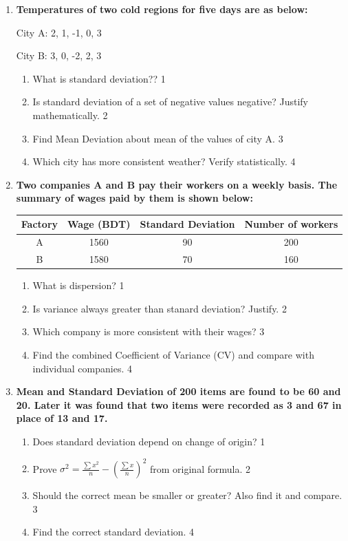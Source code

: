 \documentclass[a4paper,oneside]{book}
\begin{document}
\begin{enumerate}
    \item
  \textbf{Temperatures of two cold regions for five days are as below:}

    City A: 2, 1, -1, 0, 3

    City B: 3, 0, -2, 2, 3
  \begin{enumerate}
    \item
	What is standard deviation?? \hfill 1
    \item
	Is standard deviation of a set of negative values negative? Justify mathematically. \hfill 2
    \item  
	Find Mean Deviation about mean of the values of city A.  \hfill 3
    \item
	Which city has more consistent weather? Verify statistically. \hfill 4
\end{enumerate}

 \item
	  \textbf{Two companies A and B pay their workers on a weekly basis. The summary of wages paid by them is shown below:} 
	  
	  \begin{table}[h]
	  \centering
\begin{tabular}{c|ccc}
Factory & Wage (BDT) & Standard Deviation & Number of workers \\ \hline
A       & 1560       & 90                 & 200               \\ 
B       & 1580       & 70                 & 160              
\end{tabular}
\end{table}
  
  \begin{enumerate}
    \item
	What is dispersion? \hfill 1
    \item
	Is variance always greater than stanard deviation? Justify. \hfill 2
    \item  
	Which company is more consistent with their wages? \hfill 3
    \item
	Find the combined Coefficient of Variance (CV) and compare with individual companies. \hfill 4
  \end{enumerate}

 \item
	  \textbf{Mean and Standard Deviation of 200 items are found to be 60 and 20. Later it was found that two items were recorded as 3 and 67 in place of 13 and 17.} 
  
  \begin{enumerate}
    \item
	Does standard deviation depend on change of origin? \hfill 1
    \item
	Prove $\displaystyle \sigma^2 = \frac{\sum x^2}n -(\frac{\sum x}{n})^2$ from original formula. \hfill 2
    \item  
	Should the correct mean be smaller or greater? Also find it and compare.  \hfill 3
    \item
	Find the correct standard deviation. \hfill 4
  \end{enumerate}

\end{enumerate}
\end{document}
